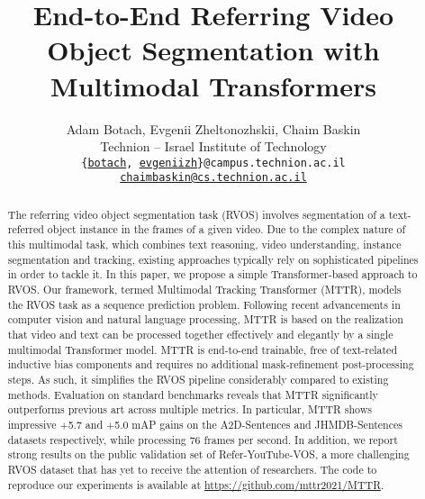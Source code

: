 \documentclass[10pt,twocolumn,letterpaper]{article}
\newcommand{\methodname}{MTTR}
\begin{document}
\title{End-to-End Referring Video Object Segmentation with Multimodal Transformers}

\author{Adam Botach, Evgenii Zheltonozhskii, Chaim Baskin\\
    {Technion -- Israel Institute of Technology}\\
{\tt\small \{\href{mailto:botach@campus.technion.ac.il}{botach}, \href{mailto:evgeniizh@campus.technion.ac.il}{evgeniizh}\}@campus.technion.ac.il \quad 
\href{mailto:chaimbaskin@cs.technion.ac.il}{chaimbaskin@cs.technion.ac.il}}
}

\maketitle

\begin{abstract}
The referring video object segmentation task (RVOS) involves  segmentation of a text-referred object instance in the frames of a given video. Due to the complex nature of this multimodal task, which combines text reasoning, video understanding, instance segmentation and tracking, existing approaches typically rely on sophisticated pipelines in order to tackle it. In this paper, we propose a simple Transformer-based approach to RVOS. Our framework, termed Multimodal Tracking Transformer (\methodname{}), models the RVOS task as a  sequence prediction problem. Following recent advancements in computer vision and natural language processing, \methodname{} is based on the realization that video and text can be processed together effectively and elegantly by a single multimodal Transformer model. \methodname{} is end-to-end trainable, free of text-related inductive bias components and requires no additional mask-refinement post-processing steps. As such, it simplifies the RVOS pipeline considerably compared to existing methods. Evaluation on standard benchmarks reveals that \methodname{} significantly outperforms previous art across multiple metrics. In particular, \methodname{} shows impressive +5.7 and +5.0 mAP gains on the A2D-Sentences and JHMDB-Sentences datasets respectively, while processing 76 frames per second. In addition, we report strong results on the public validation set of Refer-YouTube-VOS, a more challenging RVOS dataset that has yet to receive the attention of  researchers. The code to reproduce our experiments is available at \url{https://github.com/mttr2021/MTTR}.
\end{abstract}
\end{document}
